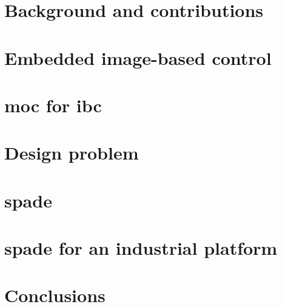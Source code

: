 


\section{Background and contributions}


\section{Embedded image-based control}
\label{sec:ch5_embeddedIBC}


\section{\texorpdfstring{\Gls{moc}}{Model of Computation} for \texorpdfstring{\gls{ibc}}{IBC}}
\label{sec:ch5_MoC}


\section{Design problem}
\label{sec:ch5_prob_statement}

 

\section{\texorpdfstring{\Acrfull{spade}}{SPADe}}
\label{sec:ch5_SPADe}




\section{\texorpdfstring{\Gls{spade}}{SPADe} for an industrial platform}
\label{sec:ch5_spadeIndustrial}




\section{Conclusions}
\label{sec:ch5_conclusion}
